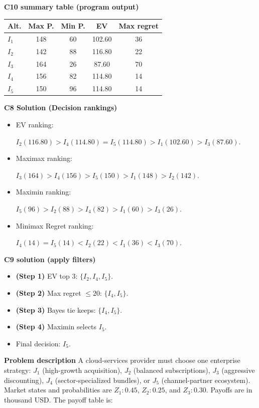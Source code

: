 \begin{ExamProblems}
		\vspace{0.25cm}
		
		\textbf{C10 summary table (program output)}\par
		\begin{center}
			\begin{tabular}{l c c c c}
				\hline
				Alt. & Max P. & Min P. & EV & Max regret \\
				\hline
				$I_1$ & 148 & 60 & 102.60 & 36 \\
				$I_2$ & 142 & 88 & 116.80 & 22 \\
				$I_3$ & 164 & 26 & 87.60 & 70 \\
				$I_4$ & 156 & 82 & 114.80 & 14 \\
				$I_5$ & 150 & 96 & 114.80 & 14 \\
				\hline
			\end{tabular}
		\end{center}
		
		\textbf{C8 Solution (Decision rankings)}\par
		\begin{itemize}
			\item EV ranking: \par $I_2(116.80)>I_4(114.80)=I_5(114.80)>I_1(102.60)>I_3(87.60)$.
			\item Maximax ranking:\par $I_3(164)>I_4(156)>I_5(150)>I_1(148)>I_2(142)$.
			\item Maximin ranking: \par $I_5(96)>I_2(88)>I_4(82)>I_1(60)>I_3(26)$.
			\item Minimax Regret ranking:\par $I_4(14)=I_5(14)<I_2(22)<I_1(36)<I_3(70)$.
		\end{itemize}
		
		\textbf{C9 solution (apply filters)}\par
		\begin{itemize}
			\item \textbf{(Step 1)} EV top 3: $\{I_2,I_4,I_5\}$.
			\item \textbf{(Step 2)} Max regret $\leq 20$: $\{I_4,I_5\}$.
			\item \textbf{(Step 3)} Bayes tie keeps: $\{I_4,I_5\}$.
			\item \textbf{(Step 4)} Maximin selects $I_5$.
			\item Final decision: $I_5$.
		\end{itemize}
		
		\newpage
		\item
		\textbf{Problem description}
		A cloud-services provider must choose one enterprise strategy: $J_1$ (high-growth acquisition), $J_2$ (balanced subscriptions), $J_3$ (aggressive discounting), $J_4$ (sector-specialized bundles), or $J_5$ (channel-partner ecosystem).
		Market states and probabilities are $Z_1:0.45$, $Z_2:0.25$, and $Z_3:0.30$. Payoffs are in thousand USD. The payoff table is:
		

\end{ExamProblems}
